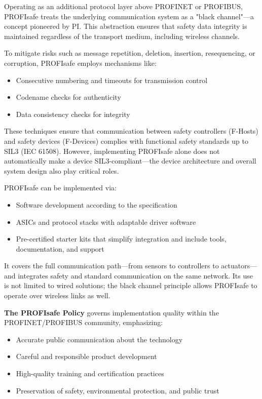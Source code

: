 \documentclass[conference]{IEEEtran}
\begin{document}
Operating as an additional protocol layer above PROFINET or PROFIBUS, PROFIsafe treats the underlying communication system as a "black channel"—a concept pioneered by PI. This abstraction ensures that safety data integrity is maintained regardless of the transport medium, including wireless channels.

To mitigate risks such as message repetition, deletion, insertion, resequencing, or corruption, PROFIsafe employs mechanisms like:
\begin{itemize}
    \item Consecutive numbering and timeouts for transmission control
    \item Codename checks for authenticity
    \item Data consistency checks for integrity
\end{itemize}

These techniques ensure that communication between safety controllers (F-Hosts) and safety devices (F-Devices) complies with functional safety standards up to SIL3 (IEC 61508). However, implementing PROFIsafe alone does not automatically make a device SIL3-compliant—the device architecture and overall system design also play critical roles.

PROFIsafe can be implemented via:
\begin{itemize}
    \item Software development according to the specification
    \item ASICs and protocol stacks with adaptable driver software
    \item Pre-certified starter kits that simplify integration and include tools, documentation, and support
\end{itemize}

It covers the full communication path—from sensors to controllers to actuators—and integrates safety and standard communication on the same network. Its use is not limited to wired solutions; the black channel principle allows PROFIsafe to operate over wireless links as well.

\textbf{The PROFIsafe Policy} governs implementation quality within the PROFINET/PROFIBUS community, emphasizing:
\begin{itemize}
    \item Accurate public communication about the technology
    \item Careful and responsible product development
    \item High-quality training and certification practices
    \item Preservation of safety, environmental protection, and public trust
\end{itemize}
\end{document}
